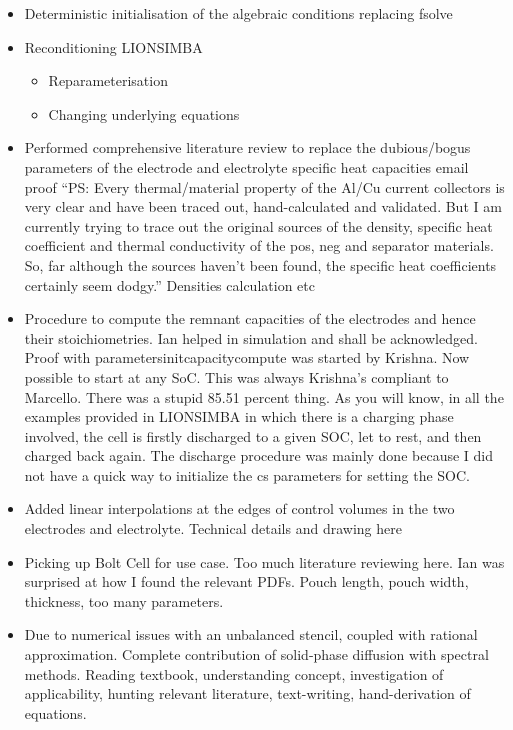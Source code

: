 \begin{itemize}
    \item Deterministic initialisation of the algebraic conditions replacing fsolve
    \item Reconditioning LIONSIMBA
        \begin{itemize}
            \item Reparameterisation
            \item Changing underlying equations
        \end{itemize}
    \item Performed comprehensive literature review to replace the dubious/bogus parameters of the electrode and electrolyte specific heat capacities email proof ``PS: Every thermal/material property of the Al/Cu current collectors is very clear and have been traced out, hand-calculated and validated.
         But I am currently trying to trace out the original sources of the density, specific heat coefficient and thermal conductivity of the pos, neg and separator materials.  So, far although the sources haven’t been found, the specific heat coefficients certainly seem dodgy.'' Densities calculation etc
     \item Procedure to compute the remnant capacities of the electrodes and hence their stoichiometries. Ian helped in simulation and shall be acknowledged. Proof with parametersinitcapacitycompute was started by Krishna. Now possible to start at any SoC. This was always Krishna's compliant to Marcello. There was a stupid 85.51 percent thing. As you will know, in all the examples provided in LIONSIMBA in which there is a charging phase involved, the cell is firstly discharged to a given SOC, let to rest, and then charged back again. The discharge procedure was mainly done because I did not have a quick way to initialize the cs parameters for setting the SOC.
    \item Added linear interpolations at the edges of control volumes in the two electrodes and electrolyte. Technical details and drawing here
    \item Picking up Bolt Cell for use case. Too much literature reviewing here. Ian was surprised at how I found the relevant PDFs. Pouch length, pouch width, thickness, too many parameters.
    \item Due to numerical issues with an unbalanced stencil, coupled with rational approximation. Complete contribution of solid-phase diffusion with spectral methods. Reading textbook, understanding concept, investigation of applicability, hunting relevant literature, text-writing, hand-derivation of equations.

\end{itemize}
